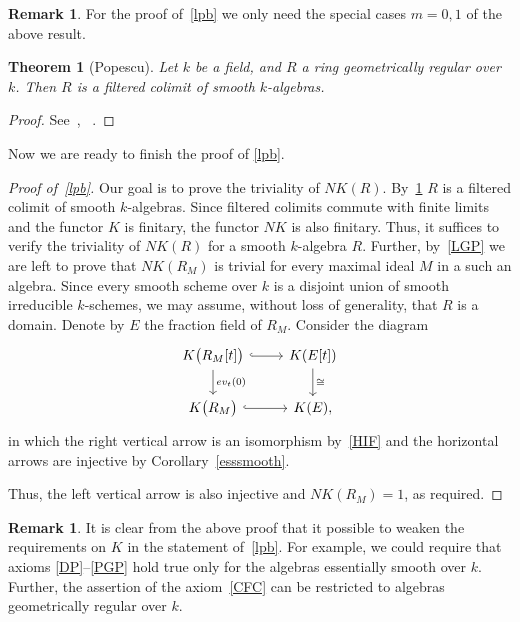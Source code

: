 \documentclass[oneside, 11pt]{amsart} \pdfoutput=1
\numberwithin{equation}{section}
\newtheorem{theorem}[lemma]{Theorem}
\theoremstyle{definition}
\newtheorem{rem}[lemma]{Remark}
\begin{document}
\begin{rem}
For the proof of~\cref{lpb} we only need the special cases $m=0,1$ of the above result.
\end{rem}

\begin{theorem}[Popescu]
\label{popescu} Let $k$ be a field, and $R$ a ring geometrically regular over $k$. Then $R$ is a filtered colimit of smooth $k$-algebras. \end{theorem}
\begin{proof} See~\cite{Po85}, ~\cite[Theorem~1.1]{Sw98}.
\end{proof}

Now we are ready to finish the proof of \cref{lpb}. %
\begin{proof}[Proof of~\cref{lpb}]
Our goal is to prove the triviality of $NK(R)$.
By~\cref{popescu} $R$ is a filtered colimit of smooth $k$-algebras.
Since filtered colimits commute with finite limits and the functor $K$ is finitary, the functor $NK$ is also finitary.
Thus, it suffices to verify the triviality of $NK(R)$ for a smooth $k$-algebra $R$.
Further, by~\cref{LGP} we are left to prove that $NK(R_M)$ is trivial for every maximal ideal $M$ in a such an algebra.
Since every smooth scheme over $k$ is a disjoint union of smooth irreducible $k$-schemes, we may assume, without loss of generality, that $R$ is a domain.
Denote by $E$ the fraction field of $R_M$. Consider the diagram
\[\begin{tikzcd}
K\bigl(R_M[t]\bigr) \ar[hookrightarrow]{r} \ar{d}{ev_t(0)} & K(E[t]) \ar{d}{\cong}\\
K\bigl(R_M\bigr) \ar[hookrightarrow]{r} & K(E),
\end{tikzcd}\]
in which the right vertical arrow is an isomorphism by~\ref{HIF} and the horizontal arrows are injective by Corollary~\ref{esssmooth}.


Thus, the left vertical arrow is also injective and $NK(R_M) = 1$, as required.
\end{proof}
\begin{rem}\label{rem:relax}
It is clear from the above proof that it possible to weaken the requirements on $K$ in the statement of~\cref{lpb}. For example, we could require that axioms \ref{DP}--\ref{PGP} hold true only for the algebras essentially smooth over $k$. Further, the assertion of the axiom~\ref{CFC} can be restricted to algebras geometrically regular over $k$.
\end{rem}
\end{document}
